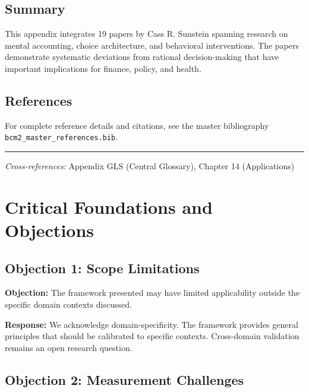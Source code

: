 \subsection{Summary}

This appendix integrates 19 papers by Cass R. Sunstein
spanning research on mental accounting, choice architecture, and behavioral
interventions. The papers demonstrate systematic deviations from rational
decision-making that have important implications for finance, policy, and health.

\subsection{References}

For complete reference details and citations, see the master bibliography
\texttt{bcm2\_master\_references.bib}.

\vspace{1em}
\hrule
\vspace{0.5em}

\noindent\textit{Cross-references:}
Appendix GLS (Central Glossary), Chapter 14 (Applications)



\section{Critical Foundations and Objections}
\label{sec:sun-foundations}

\subsection{Objection 1: Scope Limitations}

\textbf{Objection:} The framework presented may have limited applicability
outside the specific domain contexts discussed.

\textbf{Response:} We acknowledge domain-specificity. The framework provides
general principles that should be calibrated to specific contexts. Cross-domain
validation remains an open research question.

\subsection{Objection 2: Measurement Challenges}

